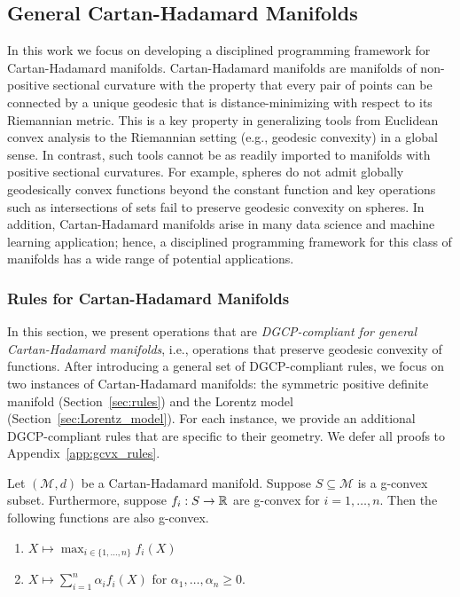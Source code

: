 \documentclass[twoside,11pt]{article}
\begin{document}



\subsection{General Cartan-Hadamard Manifolds}
In this work we focus on developing a disciplined programming framework for Cartan-Hadamard manifolds.
Cartan-Hadamard manifolds are manifolds of non-positive sectional curvature with the property that every pair of points can be connected by a unique geodesic that is distance-minimizing with respect to its Riemannian metric. This is a key property in generalizing tools from Euclidean convex analysis to the Riemannian setting (e.g., geodesic convexity) in a global sense. In contrast, such tools cannot be as readily imported to manifolds with positive sectional curvatures. For example, spheres do not admit globally geodesically convex functions beyond the constant function and key operations such as intersections of sets fail to preserve geodesic convexity on spheres. In addition, Cartan-Hadamard manifolds arise in many data science and machine learning application; hence, a disciplined programming framework for this class of manifolds has a wide range of potential applications.


\subsubsection{Rules for Cartan-Hadamard Manifolds}
In this section, we present operations that are \emph{DGCP-compliant for general Cartan-Hadamard manifolds}, i.e., operations that preserve geodesic convexity of functions.
After introducing a general set of DGCP-compliant rules, we focus on two instances of Cartan-Hadamard manifolds: the symmetric positive definite manifold (Section~\ref{sec:rules}) and the Lorentz model (Section~\ref{sec:Lorentz_model}). For each instance, we provide an additional DGCP-compliant rules that are specific to their geometry.
We defer all proofs to Appendix~\ref{app:gcvx_rules}.

\begin{prop}\label{prop:coniccomb_pwmax}
    Let $(\mathcal{M}, d)$ be a Cartan-Hadamard manifold. Suppose $S \subseteq \mathcal{M}$ is a g-convex subset. Furthermore, suppose $f_i: S \to \mathbb{R}$ are g-convex for $i= 1, \ldots, n$. Then the following functions are also g-convex.
     \begin{enumerate}
        \item $X \mapsto \max_{i \in \{1,\ldots, n\}}f_i(X)$
        \item $X \mapsto \sum_{i=1}^n \alpha_i f_i(X) $ for $\alpha_1, \ldots, \alpha_n  \geq 0$.
    \end{enumerate}
\end{prop}
\end{document}
